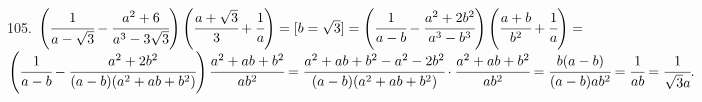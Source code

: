 105. $\left(\cfrac{1}{a-\sqrt{3}}-\cfrac{a^2+6}{a^3-3\sqrt{3}}\right) \left (\cfrac{a+\sqrt{3}}{3}+\cfrac{1}{a}\right)=[b=\sqrt{3}]=
\left(\cfrac{1}{a-b}-\cfrac{a^2+2b^2}{a^3-b^3}\right) \left (\cfrac{a+b}{b^2}+\cfrac{1}{a}\right)=$\\$\left(\cfrac{1}{a-b}-\cfrac{a^2+2b^2}{(a-b)(a^2+ab+b^2)}\right) \cfrac{a^2+ab+b^2}{ab^2}=\cfrac{a^2+ab+b^2-a^2-2b^2}{(a-b)(a^2+ab+b^2)}\cdot
\cfrac{a^2+ab+b^2}{ab^2}=\cfrac{b(a-b)}{(a-b)ab^2}=\cfrac{1}{ab}=\cfrac{1}{\sqrt{3}a}.$
\newpage
